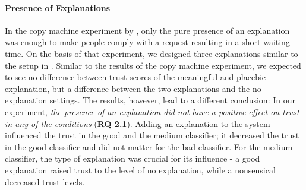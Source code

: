 \paragraph{Presence of Explanations} 
In the copy machine experiment by \cite{langer1978mindlessness}, only the pure presence of an explanation was enough to make people comply with a request resulting in a short waiting time. On the basis of that experiment, we designed three explanations similar to the setup in \cite{langer1978mindlessness}. Similar to the results of the copy machine experiment, we expected to see no difference between trust scores of the meaningful and placebic explanation, but a difference between the two explanations and the no explanation settings. The results, however, lead to a different conclusion: In our experiment, \textit{the presence of an explanation did not have a positive effect on trust in any of the conditions} (\textbf{RQ 2.1}). Adding an explanation to the system influenced the trust in the good and the medium classifier; it decreased the trust in the good classifier and did not matter for the bad classifier. For the medium classifier, the type of explanation was crucial for its influence - a good explanation raised trust to the level of no explanation, while a nonsensical decreased trust levels.\newline
